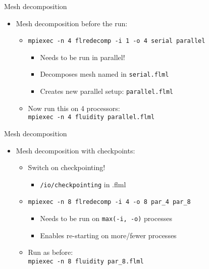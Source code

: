 \documentclass[t, hyperref={pdfpagelabels=false}]{beamer}
\begin{document}
\begin{frame}{Mesh decomposition}
  \begin{itemize}
  \item[] Mesh decomposition before the run:
    \begin{itemize}

      \vspace{1em}
    \item \lstinline+mpiexec -n 4 flredecomp -i 1 -o 4 serial parallel+
      \begin{itemize}
      \item Needs to be run in parallel!
      \item Decomposes mesh named in \lstinline+serial.flml+
      \item Creates new parallel setup: \lstinline+parallel.flml+
      \end{itemize}

      \vspace{1em}
    \item Now run this on 4 processors: \\
      \lstinline+mpiexec -n 4 fluidity parallel.flml+
    \end{itemize}
  \end{itemize}
\end{frame}

\begin{frame}{Mesh decomposition}
  \begin{itemize}
  \item[] Mesh decomposition with checkpoints:
    \begin{itemize}
      \vspace{1em}
    \item Switch on checkpointing!
      \begin{itemize}
      \item \lstinline+/io/checkpointing+ in .flml
      \end{itemize}

      \vspace{1em}
    \item \lstinline+mpiexec -n 8 flredecomp -i 4 -o 8 par_4 par_8+
      \begin{itemize}
      \item Needs to be run on \lstinline+max(-i, -o)+ processes
      \item Enables re-starting on more/fewer processes
      \end{itemize}

      \vspace{1em}
    \item Run as before: \\
      \lstinline+mpiexec -n 8 fluidity par_8.flml+
    \end{itemize}
  \end{itemize}
\end{frame}
\end{document}
